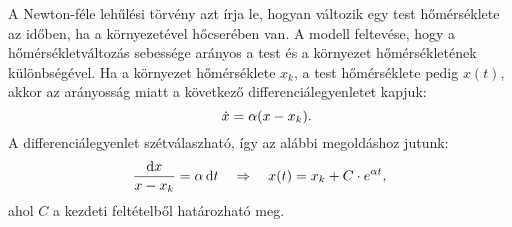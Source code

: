 \documentclass{szb-practice}
\begin{document}
\begin{blueBox}
  A Newton-féle lehűlési törvény azt írja le, hogyan változik egy test
  hőmérséklete az időben, ha a környezetével hőcserében van. A modell feltevése,
  hogy a hőmérsékletváltozás sebessége arányos a test és a környezet
  hőmérsékletének különbségével. Ha a környezet hőmérséklete $x_k$, a test
  hőmérséklete pedig $x(t)$, akkor az arányosság miatt a következő
  differenciálegyenletet kapjuk:
  $$
    \quad \dot{x} = \alpha(x - x_k)
    \text.
  $$
  A differenciálegyenlet szétválaszható, így az alábbi megoldáshoz jutunk:
  \begin{gather*}
    \frac{\mathop{}\!\mathrm{d} x}{x - x_k} = \alpha \mathop{}\!\mathrm{d} t
    \quad \Rightarrow \quad
    x(t) = x_k + C \cdot e^{\alpha t}
    \text,
  \end{gather*}
  ahol $C$ a kezdeti feltételből határozható meg.
\end{blueBox}
\end{document}
